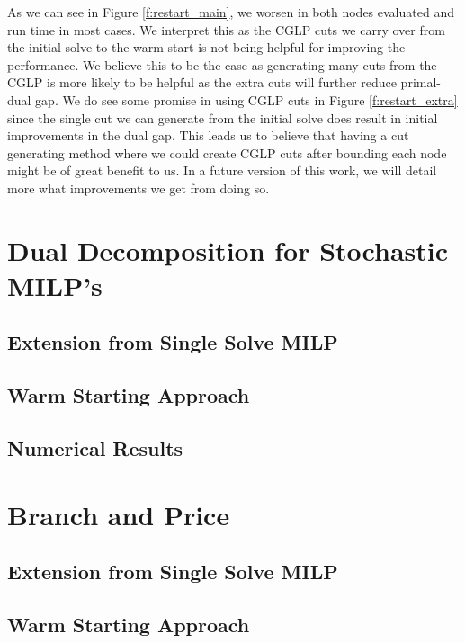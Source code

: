 \documentclass[10pt]{article}
\begin{document}
	As we can see in Figure \ref{f:restart_main}, we worsen in both nodes evaluated and run time in most cases. We interpret this as the CGLP cuts we carry over from the initial solve to the warm start is not being helpful for improving the performance. We believe this to be the case as generating many cuts from the CGLP is more likely to be helpful as the extra cuts will further reduce primal-dual gap. We do see some promise in using CGLP cuts in Figure \ref{f:restart_extra} since the single cut we can generate from the initial solve does result in initial improvements in the dual gap. This leads us to believe that having a cut generating method where we could create CGLP cuts after bounding each node might be of great benefit to us. In a future version of this work, we will detail more what improvements we get from doing so.
	
	\section{Dual Decomposition for Stochastic MILP's}\label{s:stochastic}
	
	\subsection{Extension from Single Solve MILP}
	
	\subsection{Warm Starting Approach}
	
	\subsection{Numerical Results}
	
	\section{Branch and Price}\label{s:bnp}
	
	\subsection{Extension from Single Solve MILP}
	
	\subsection{Warm Starting Approach}
	
\end{document}
